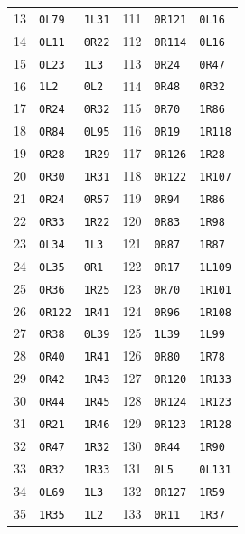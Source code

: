 \begin{longtable}{rll@{\qquad}rll}
13 & \texttt{0L79} & \texttt{1L31} & 111 & \texttt{0R121} & \texttt{0L16}\\
14 & \texttt{0L11} & \texttt{0R22} & 112 & \texttt{0R114} & \texttt{0L16}\\
15 & \texttt{0L23} & \texttt{1L3} & 113 & \texttt{0R24} & \texttt{0R47}\\
16 & \texttt{1L2} & \texttt{0L2} & 114 & \texttt{0R48} & \texttt{0R32}\\
17 & \texttt{0R24} & \texttt{0R32} & 115 & \texttt{0R70} & \texttt{1R86}\\
18 & \texttt{0R84} & \texttt{0L95} & 116 & \texttt{0R19} & \texttt{1R118}\\
19 & \texttt{0R28} & \texttt{1R29} & 117 & \texttt{0R126} & \texttt{1R28}\\
20 & \texttt{0R30} & \texttt{1R31} & 118 & \texttt{0R122} & \texttt{1R107}\\
21 & \texttt{0R24} & \texttt{0R57} & 119 & \texttt{0R94} & \texttt{1R86}\\
22 & \texttt{0R33} & \texttt{1R22} & 120 & \texttt{0R83} & \texttt{1R98}\\
23 & \texttt{0L34} & \texttt{1L3} & 121 & \texttt{0R87} & \texttt{1R87}\\
24 & \texttt{0L35} & \texttt{0R1} & 122 & \texttt{0R17} & \texttt{1L109}\\
25 & \texttt{0R36} & \texttt{1R25} & 123 & \texttt{0R70} & \texttt{1R101}\\
26 & \texttt{0R122} & \texttt{1R41} & 124 & \texttt{0R96} & \texttt{1R108}\\
27 & \texttt{0R38} & \texttt{0L39} & 125 & \texttt{1L39} & \texttt{1L99}\\
28 & \texttt{0R40} & \texttt{1R41} & 126 & \texttt{0R80} & \texttt{1R78}\\
29 & \texttt{0R42} & \texttt{1R43} & 127 & \texttt{0R120} & \texttt{1R133}\\
30 & \texttt{0R44} & \texttt{1R45} & 128 & \texttt{0R124} & \texttt{1R123}\\
31 & \texttt{0R21} & \texttt{1R46} & 129 & \texttt{0R123} & \texttt{1R128}\\
32 & \texttt{0R47} & \texttt{1R32} & 130 & \texttt{0R44} & \texttt{1R90}\\
33 & \texttt{0R32} & \texttt{1R33} & 131 & \texttt{0L5} & \texttt{0L131}\\
34 & \texttt{0L69} & \texttt{1L3} & 132 & \texttt{0R127} & \texttt{1R59}\\
35 & \texttt{1R35} & \texttt{1L2} & 133 & \texttt{0R11} & \texttt{1R37}\\

\end{longtable}

